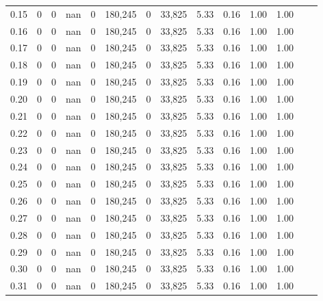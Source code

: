 \begin{tabular}{rrrrrrrrrrrrrr}
0.15 &       0 &      0 &     nan &        0 &  180,245 &       0 &  33,825 &  5.33 &  0.16 &  1.00 &      1.00 \\
0.16 &       0 &      0 &     nan &        0 &  180,245 &       0 &  33,825 &  5.33 &  0.16 &  1.00 &      1.00 \\
0.17 &       0 &      0 &     nan &        0 &  180,245 &       0 &  33,825 &  5.33 &  0.16 &  1.00 &      1.00 \\
0.18 &       0 &      0 &     nan &        0 &  180,245 &       0 &  33,825 &  5.33 &  0.16 &  1.00 &      1.00 \\
0.19 &       0 &      0 &     nan &        0 &  180,245 &       0 &  33,825 &  5.33 &  0.16 &  1.00 &      1.00 \\
0.20 &       0 &      0 &     nan &        0 &  180,245 &       0 &  33,825 &  5.33 &  0.16 &  1.00 &      1.00 \\
0.21 &       0 &      0 &     nan &        0 &  180,245 &       0 &  33,825 &  5.33 &  0.16 &  1.00 &      1.00 \\
0.22 &       0 &      0 &     nan &        0 &  180,245 &       0 &  33,825 &  5.33 &  0.16 &  1.00 &      1.00 \\
0.23 &       0 &      0 &     nan &        0 &  180,245 &       0 &  33,825 &  5.33 &  0.16 &  1.00 &      1.00 \\
0.24 &       0 &      0 &     nan &        0 &  180,245 &       0 &  33,825 &  5.33 &  0.16 &  1.00 &      1.00 \\
0.25 &       0 &      0 &     nan &        0 &  180,245 &       0 &  33,825 &  5.33 &  0.16 &  1.00 &      1.00 \\
0.26 &       0 &      0 &     nan &        0 &  180,245 &       0 &  33,825 &  5.33 &  0.16 &  1.00 &      1.00 \\
0.27 &       0 &      0 &     nan &        0 &  180,245 &       0 &  33,825 &  5.33 &  0.16 &  1.00 &      1.00 \\
0.28 &       0 &      0 &     nan &        0 &  180,245 &       0 &  33,825 &  5.33 &  0.16 &  1.00 &      1.00 \\
0.29 &       0 &      0 &     nan &        0 &  180,245 &       0 &  33,825 &  5.33 &  0.16 &  1.00 &      1.00 \\
0.30 &       0 &      0 &     nan &        0 &  180,245 &       0 &  33,825 &  5.33 &  0.16 &  1.00 &      1.00 \\
0.31 &       0 &      0 &     nan &        0 &  180,245 &       0 &  33,825 &  5.33 &  0.16 &  1.00 &      1.00 \\

\end{tabular}
